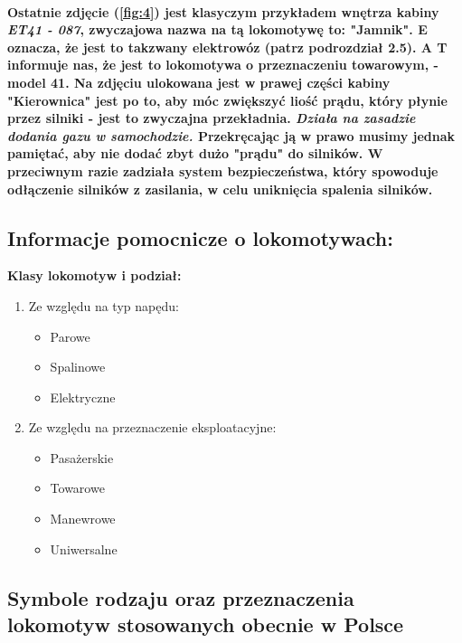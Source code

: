     \paragraph{\hspace{10mm}Ostatnie zdjęcie (\ref{fig:4}) jest klasyczym przykładem wnętrza kabiny \textit{ET41 - 087}, zwyczajowa nazwa na tą lokomotywę to: "Jamnik". E oznacza, że jest to takzwany elektrowóz (patrz podrozdział 2.5). A T informuje nas, że jest to lokomotywa o przeznaczeniu towarowym, - model 41. Na  zdjęciu ulokowana jest w prawej części kabiny "Kierownica" jest po to, aby móc zwiększyć liość prądu, który płynie przez silniki - jest to zwyczajna przekładnia. \emph{Działa na zasadzie dodania gazu w samochodzie. }\textbf{Przekręcając ją w prawo musimy jednak pamiętać, aby nie dodać zbyt dużo "prądu" do silników. W przeciwnym razie zadziała system bezpieczeństwa, który spowoduje odłączenie silników z zasilania, w celu uniknięcia spalenia silników.}}


\subsection{Informacje pomocnicze o lokomotywach:}
\textbf{Klasy lokomotyw i podział:}
\begin{enumerate}
\item Ze względu na typ napędu:
    \begin{itemize}
    \item Parowe
    \item Spalinowe
    \item Elektryczne
    \end{itemize}
\item Ze względu na przeznaczenie eksploatacyjne:
    \begin{itemize}
    \item Pasażerskie
    \item Towarowe
    \item Manewrowe
    \item Uniwersalne
    \end{itemize}
\end{enumerate}


\subsection{Symbole rodzaju oraz przeznaczenia lokomotyw stosowanych obecnie w Polsce}


